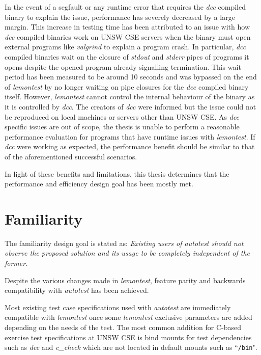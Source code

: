 \documentclass[hidelinks]{report}
\begin{document}
In the event of a segfault or any runtime error that requires the \textit{dcc} compiled binary to explain the issue, performance has severely decreased by a large margin. This increase in testing time has been attributed to an issue with how \textit{dcc} compiled binaries work on UNSW CSE servers when the binary must open external programs like \textit{valgrind} to explain a program crash. In particular, \textit{dcc} compiled binaries wait on the closure of \textit{stdout} and \textit{stderr} pipes of programs it opens despite the opened program already signalling termination. This wait period has been measured to be around 10 seconds and was bypassed on the end of \textit{lemontest} by no longer waiting on pipe closures for the \textit{dcc} compiled binary itself. However, \textit{lemontest} cannot control the internal behaviour of the binary as it is controlled by \textit{dcc}. The creators of \textit{dcc} were informed but the issue could not be reproduced on local machines or servers other than UNSW CSE. As \textit{dcc} specific issues are out of scope, the thesis is unable to perform a reasonable performance evaluation for programs that have runtime issues with \textit{lemontest}. If \textit{dcc} were working as expected, the performance benefit should be similar to that of the aforementioned successful scenarios.

In light of these benefits and limitations, this thesis determines that the performance and efficiency design goal has been mostly met.

\section{Familiarity}
The familiarity design goal is stated as: \textit{Existing users of autotest should not observe the proposed solution and its usage to be completely independent of the former.}

Despite the various changes made in \textit{lemontest}, feature parity and backwards compatibility with \textit{autotest} has been achieved.

Most existing test case specifications used with \textit{autotest} are immediately compatible with \textit{lemontest} once some \textit{lemontest} exclusive parameters are added depending on the needs of the test. The most common addition for C-based exercise test specifications at UNSW CSE is bind mounts for test dependencies such as \textit{dcc} and \textit{c\_check} which are not located in default mounts such as ``\lstinline|/bin|".
\end{document}
